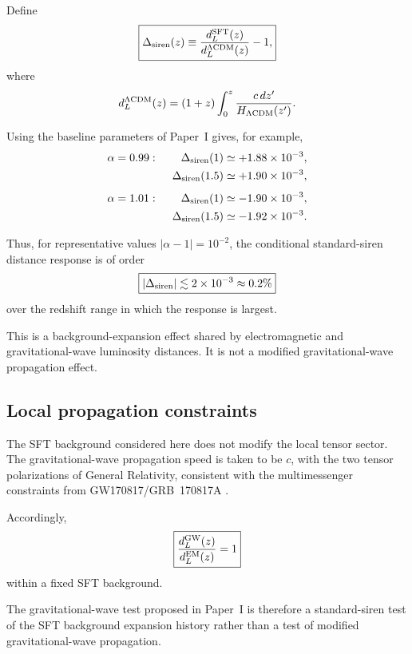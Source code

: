 \documentclass[12pt]{article}
\begin{document}
Define
\begin{equation}
\boxed{
\Delta_{\rm siren}(z)
\equiv
\frac{d_L^{\rm SFT}(z)}
     {d_L^{\Lambda{\rm CDM}}(z)}
-1,
}
\label{eq:delta_siren}
\end{equation}
where
\begin{equation}
d_L^{\Lambda{\rm CDM}}(z)
=
(1+z)
\int_0^z
\frac{c\,dz'}{H_{\Lambda{\rm CDM}}(z')}.
\end{equation}

Using the baseline parameters of Paper~I gives, for example,
\begin{align}
\alpha=0.99:\qquad
\Delta_{\rm siren}(1)
&\simeq +1.88\times10^{-3},
\\
\Delta_{\rm siren}(1.5)
&\simeq +1.90\times10^{-3},
\\[4pt]
\alpha=1.01:\qquad
\Delta_{\rm siren}(1)
&\simeq -1.90\times10^{-3},
\\
\Delta_{\rm siren}(1.5)
&\simeq -1.92\times10^{-3}.
\end{align}

Thus, for representative values
$|\alpha-1|=10^{-2}$, the conditional standard-siren distance response
is of order
\begin{equation}
\boxed{
|\Delta_{\rm siren}|
\lesssim 2\times10^{-3}
\approx0.2\%
}
\end{equation}
over the redshift range in which the response is largest.

This is a background-expansion effect shared by electromagnetic and
gravitational-wave luminosity distances. It is not a modified
gravitational-wave propagation effect.


\subsection{Local propagation constraints}

The SFT background considered here does not modify the local tensor
sector. The gravitational-wave propagation speed is taken to be $c$,
with the two tensor polarizations of General Relativity, consistent
with the multimessenger constraints from GW170817/GRB~170817A
\cite{Abbott2017GW,Goldstein2017,Savchenko2017}.

Accordingly,
\begin{equation}
\boxed{
\frac{d_L^{\rm GW}(z)}
     {d_L^{\rm EM}(z)}
=1
}
\end{equation}
within a fixed SFT background.

The gravitational-wave test proposed in Paper~I is therefore a
standard-siren test of the SFT background expansion history rather
than a test of modified gravitational-wave propagation.
\end{document}
